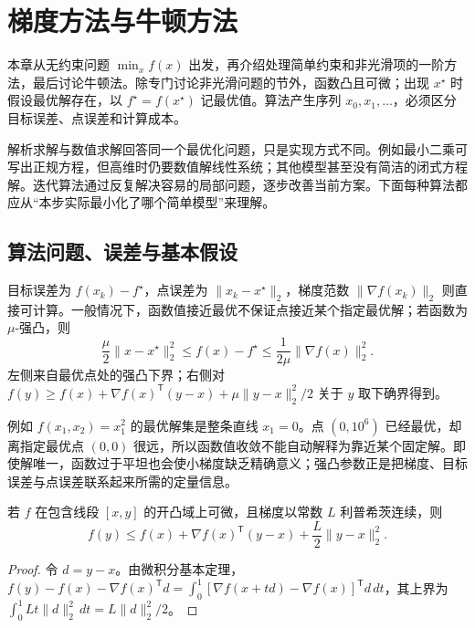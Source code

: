 \setcounter{chapter}{8} %
\chapter{梯度方法与牛顿方法}
\label{ch:co-unconstrained}

本章从无约束问题 $\min_x f(x)$ 出发，再介绍处理简单约束和非光滑项的一阶方法，最后讨论牛顿法。除专门讨论非光滑问题的节外，函数凸且可微；出现 $x^\star$ 时假设最优解存在，以 $f^\star=f(x^\star)$ 记最优值。算法产生序列 $x_0,x_1,\ldots$，必须区分目标误差、点误差和计算成本。

解析求解与数值求解回答同一个最优化问题，只是实现方式不同。例如最小二乘可写出正规方程，但高维时仍要数值解线性系统；其他模型甚至没有简洁的闭式方程解。迭代算法通过反复解决容易的局部问题，逐步改善当前方案。下面每种算法都应从“本步实际最小化了哪个简单模型”来理解。

\section{算法问题、误差与基本假设}

目标误差为 $f(x_k)-f^\star$，点误差为 $\|x_k-x^\star\|_2$，梯度范数 $\|\nabla f(x_k)\|_2$ 则直接可计算。一般情况下，函数值接近最优不保证点接近某个指定最优解；若函数为 $\mu$-强凸，则
\[
 \frac\mu2\|x-x^\star\|_2^2\leq f(x)-f^\star
 \leq\frac1{2\mu}\|\nabla f(x)\|_2^2.
\]
左侧来自最优点处的强凸下界；右侧对 $f(y)\geq f(x)+\nabla f(x)^{\mathsf T}(y-x)+\mu\|y-x\|_2^2/2$ 关于 $y$ 取下确界得到。

例如 $f(x_1,x_2)=x_1^2$ 的最优解集是整条直线 $x_1=0$。点 $(0,10^6)$ 已经最优，却离指定最优点 $(0,0)$ 很远，所以函数值收敛不能自动解释为靠近某个固定解。即使解唯一，函数过于平坦也会使小梯度缺乏精确意义；强凸参数正是把梯度、目标误差与点误差联系起来所需的定量信息。

\begin{lemma}[下降引理]
若 $f$ 在包含线段 $[x,y]$ 的开凸域上可微，且梯度以常数 $L$ 利普希茨连续，则
\begin{equation}
 f(y)\leq f(x)+\nabla f(x)^{\mathsf T}(y-x)+\frac L2\|y-x\|_2^2.
 \label{eq:co-descent-lemma}
\end{equation}
\end{lemma}
\begin{proof}
令 $d=y-x$。由微积分基本定理，$f(y)-f(x)-\nabla f(x)^{\mathsf T}d=\int_0^1[\nabla f(x+td)-\nabla f(x)]^{\mathsf T}d\,dt$，其上界为 $\int_0^1Lt\|d\|_2^2\,dt=L\|d\|_2^2/2$。
\end{proof}

